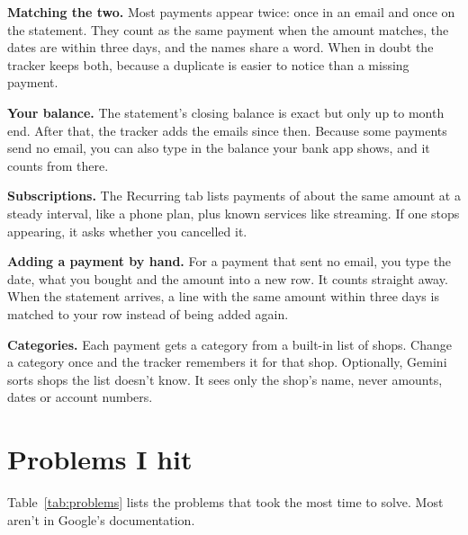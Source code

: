 \documentclass[10pt]{article}
\begin{document}
\textbf{Matching the two.} Most payments appear twice: once in an email and once on the statement. They count as the same payment when the amount matches, the dates are within three days, and the names share a word. When in doubt the tracker keeps both, because a duplicate is easier to notice than a missing payment.

\textbf{Your balance.} The statement's closing balance is exact but only up to month end. After that, the tracker adds the emails since then. Because some payments send no email, you can also type in the balance your bank app shows, and it counts from there.

\textbf{Subscriptions.} The Recurring tab lists payments of about the same amount at a steady interval, like a phone plan, plus known services like streaming. If one stops appearing, it asks whether you cancelled it.

\textbf{Adding a payment by hand.} For a payment that sent no email, you type the date, what you bought and the amount into a new row. It counts straight away. When the statement arrives, a line with the same amount within three days is matched to your row instead of being added again.

\textbf{Categories.} Each payment gets a category from a built-in list of shops. Change a category once and the tracker remembers it for that shop. Optionally, Gemini sorts shops the list doesn't know. It sees only the shop's name, never amounts, dates or account numbers.

\section{Problems I hit}

Table~\ref{tab:problems} lists the problems that took the most time to solve. Most aren't in Google's documentation.
\end{document}
